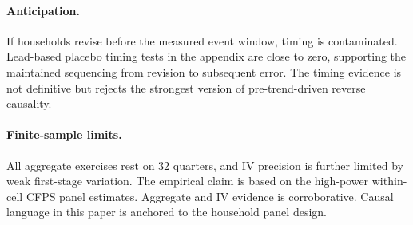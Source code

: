 \paragraph{Anticipation.}
If households revise before the measured event window, timing is
contaminated. Lead-based placebo timing tests in the appendix are close to
zero, supporting the maintained sequencing from revision to subsequent
error. The timing evidence is not definitive but rejects the strongest
version of pre-trend-driven reverse causality.

\paragraph{Finite-sample limits.}
All aggregate exercises rest on 32 quarters, and IV precision is further
limited by weak first-stage variation. The empirical claim is based on the
high-power within-cell CFPS panel estimates. Aggregate and IV evidence is
corroborative. Causal language in this paper is anchored to the household
panel design.




